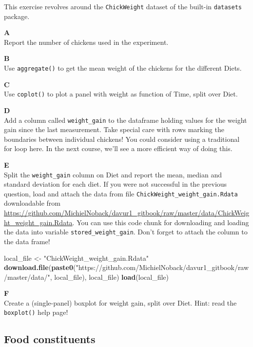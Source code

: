 \documentclass[]{book}
\newenvironment{Shaded}{\begin{snugshade}}{\end{snugshade}}
\newcommand{\KeywordTok}[1]{\textcolor[rgb]{0.13,0.29,0.53}{\textbf{#1}}}
\newcommand{\NormalTok}[1]{#1}
\newcommand{\StringTok}[1]{\textcolor[rgb]{0.31,0.60,0.02}{#1}}
\begin{document}
This exercise revolves around the \texttt{ChickWeight} dataset of the built-in \texttt{datasets} package.

\textbf{A}\\
Report the number of chickens used in the experiment.

\textbf{B}\\
Use \texttt{aggregate()} to get the mean weight of the chickens for the different Diets.

\textbf{C}\\
Use \texttt{coplot()} to plot a panel with weight as function of Time, split over Diet.

\textbf{D}\\
Add a column called \texttt{weight\_gain} to the dataframe holding values for the weight gain since the last measurement. Take special care with rows marking the boundaries between individual chickens! You could consider using a traditional for loop here.
In the next course, we'll see a more efficient way of doing this.

\textbf{E}\\
Split the \texttt{weight\_gain} column on Diet and report the mean, median and standard deviation for each diet.
If you were not successful in the previous question, load and attach the data from file \texttt{ChickWeight\_weight\_gain.Rdata} downloadable from \url{https://github.com/MichielNoback/davur1_gitbook/raw/master/data/ChickWeight_weight_gain.Rdata}. You can use this code chunk for downloading and loading the data into variable \texttt{stored\_weight\_gain}. Don't forget to attach the column to the data frame!

\begin{Shaded}
\begin{Highlighting}[]
\NormalTok{local_file <-}\StringTok{ "ChickWeight_weight_gain.Rdata"}
\KeywordTok{download.file}\NormalTok{(}\KeywordTok{paste0}\NormalTok{(}\StringTok{"https://github.com/MichielNoback/davur1_gitbook/raw/master/data/"}\NormalTok{, local_file), local_file)}
\KeywordTok{load}\NormalTok{(local_file)}
\end{Highlighting}
\end{Shaded}

\textbf{F}\\
Create a (single-panel) boxplot for weight gain, split over Diet. Hint: read the \texttt{boxplot()} help page!

\hypertarget{food-constituents}{%
\subsection{Food constituents}\label{food-constituents}}
\end{document}

